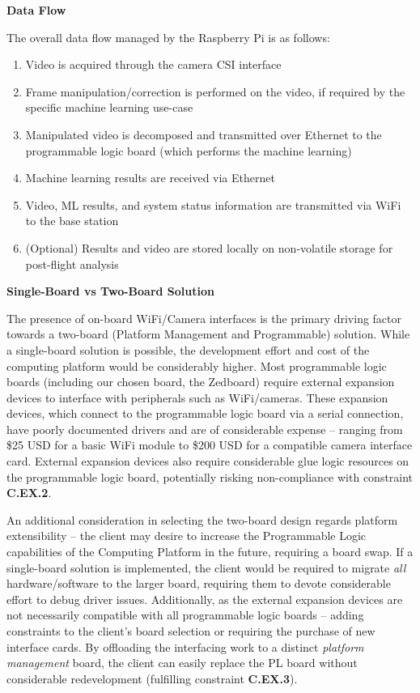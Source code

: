 \textbf{Data Flow}

The overall data flow managed by the Raspberry Pi is as follows:
\begin{enumerate}
\item Video is acquired through the camera CSI interface
\item Frame manipulation/correction is performed on the video, if required by the specific machine learning use-case
\item Manipulated video is decomposed and transmitted over Ethernet to the programmable logic board (which performs the machine learning)
\item Machine learning results are received via Ethernet
\item Video, ML results, and system status information are transmitted via WiFi to the base station
\item (Optional) Results and video are stored locally on non-volatile storage for post-flight analysis
\end{enumerate}

\textbf{Single-Board vs Two-Board Solution}

The presence of on-board WiFi/Camera interfaces is the primary driving factor towards a two-board (Platform Management and Programmable) solution. While a single-board solution is possible, the development effort and cost of the computing platform would be considerably higher. Most programmable logic boards (including our chosen board, the Zedboard) require external expansion devices to interface with peripherals such as WiFi/cameras. These expansion devices, which connect to the programmable logic board via a serial connection, have poorly documented drivers and are of considerable expense -- ranging from \$25 USD for a basic WiFi module to \$200 USD for a compatible camera interface card. External expansion devices also require considerable glue logic resources on the programmable logic board, potentially risking non-compliance with constraint \textbf{C.EX.2}.

An additional consideration in selecting the two-board design regards platform extensibility -- the client may desire to increase the Programmable Logic capabilities of the Computing Platform in the future, requiring a board swap. If a single-board solution is implemented, the client would be required to migrate \textit{all} hardware/software to the larger board, requiring them to devote considerable effort to debug driver issues. Additionally, as the external expansion devices are not necessarily compatible with all programmable logic boards -- adding constraints to the client's board selection or requiring the purchase of new interface cards. By offloading the interfacing work to a distinct \textit{platform management} board, the client can easily replace the PL board without considerable redevelopment (fulfilling constraint \textbf{C.EX.3}).

